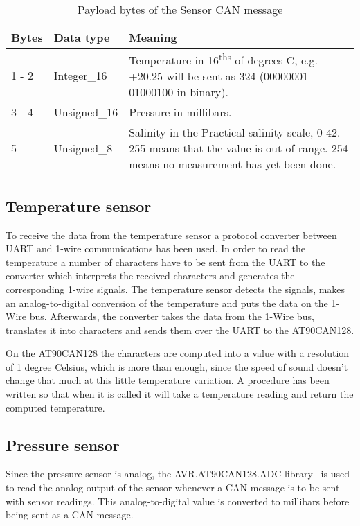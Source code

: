 \begin{table*}
\centering
    \caption{Payload bytes of the Sensor CAN message }
    \begin{tabular}{|l|l|p{11cm}|} \hline
    \label{table:SensorMessage}
    	\textbf{Bytes} & \textbf{Data type} & \textbf{Meaning} \\ \hline
        1 - 2 & Integer\_16 & Temperature in 16\textsuperscript{ths} of degrees C, e.g. +20.25 will be sent as 324 \newline 
        (00000001 01000100 in binary). \\ \hline
        3 - 4 & Unsigned\_16 & Pressure in millibars. \\ \hline
        5  & Unsigned\_8 & Salinity in the Practical salinity scale, 0-42. 255 means that the value is out of range. 254 means no measurement has yet been done. \\ \hline
    \end{tabular}
\end{table*}

\subsection{Temperature sensor}
To receive the data from the temperature sensor a protocol converter between UART and 1-wire communications has been used. In order to read the temperature a number of characters have to be sent from the UART to the converter which interprets the received characters and generates the corresponding 1-wire signals. The temperature sensor detects the signals, makes an analog-to-digital conversion of the temperature and puts the data on the 1-Wire bus. Afterwards, the converter takes the data from the 1-Wire bus, translates it into characters and sends them over the UART to the AT90CAN128. 

On the AT90CAN128 the characters are computed into a value with a resolution of 1 degree Celsius, which is more than enough, since the speed of sound doesn't change that much at this little temperature variation. A procedure has been written so that when it is called it will take a temperature reading and return the computed temperature.

\subsection{Pressure sensor}
Since the pressure sensor is analog, the AVR.AT90CAN128.ADC library~\cite{web:github_naiad-auv-software} is used to read the analog output of the sensor whenever a CAN message is to be sent with sensor readings. This analog-to-digital value is converted to millibars before being sent as a CAN message. 


